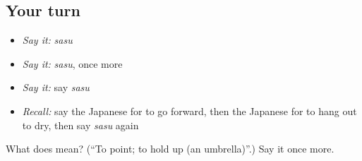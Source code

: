 \subsection*{Your turn}
\begin{itemize}
\raggedright
  \item \emph{Say it:} \emph{sasu}
  \item \emph{Say it:} \emph{sasu}, once more
  \item \emph{Say it:} say \emph{sasu}
  \item \emph{Recall:} say the Japanese for to go forward, then the Japanese for to hang out to dry, then say \emph{sasu} again
\end{itemize}

\begin{tcolorbox}[breakable,colback=teal!4,colframe=teal!35!black,title={Before you move on}]
What does  mean? (\textquotedblleft{}To point; to hold up (an umbrella)\textquotedblright{}.) Say it once more.
\end{tcolorbox}

